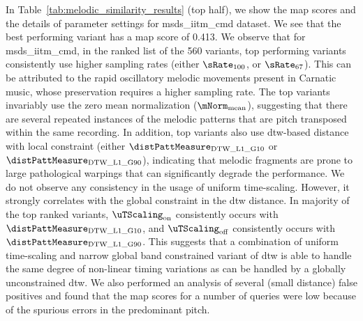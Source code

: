 In Table~\ref{tab:melodic_similarity_results} (top half), we show the \gls{map} scores and the details of parameter settings for \acrshort{msds_iitm_cmd} dataset. We see that the best performing variant has a \gls{map} score of 0.413. We observe that for \acrshort{msds_iitm_cmd}, in the ranked list of the 560 variants, top performing variants consistently use higher sampling rates (either  $\sRate_{100}$, or $\sRate_{67}$). This can be attributed to the rapid oscillatory melodic movements present in Carnatic music, whose preservation requires a higher sampling rate. The top variants invariably use the zero mean normalization ($\mNorm_{\mathrm{mean}}$), suggesting that there are several repeated instances of the melodic patterns that are pitch transposed within the same recording. In addition, top variants also use \gls{dtw}-based distance with local constraint (either $\distPattMeasure_{\mathrm{DTW\_L1\_G10}}$ or $\distPattMeasure_{\mathrm{DTW\_L1\_G90}}$), indicating that melodic fragments are prone to large pathological warpings that can significantly degrade the performance. We do not observe any consistency in the usage of uniform time-scaling. However, it strongly correlates with the global constraint in the \gls{dtw} distance. In majority of the top ranked variants, $\uTScaling_{\mathrm{on}}$ consistently occurs with $\distPattMeasure_{\mathrm{DTW\_L1\_G10}}$, and $\uTScaling_{\mathrm{off}}$ consistently occurs with $\distPattMeasure_{\mathrm{DTW\_L1\_G90}}$. This suggests that a combination of uniform time-scaling and narrow global band constrained variant of \gls{dtw} is able to handle the same degree of non-linear timing variations as can be handled by a globally unconstrained \gls{dtw}. We also performed an analysis of several (small distance) false positives and found that the \gls{map} scores for a number of queries were low because of the spurious errors in the predominant pitch.


